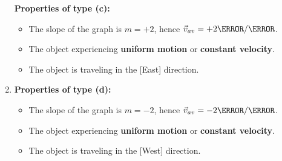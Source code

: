 \documentclass[12pt]{article}
\theoremstyle{break}
\begin{document}
\begin{enumerate}[label = (\alph*)]
		
		\textbf{\large{Properties of type (c):}}
		\begin{itemize}
			\item The slope of the graph is $m = +2$, hence $\vec v_{av} = +2\m / \s$.
			\item The object experiencing \textbf{uniform motion} or \textbf{constant velocity}.
			\item The object is traveling in the [East] direction.
		\end{itemize}

	\item 
		
		\textbf{\large{Properties of type (d):}}
		\begin{itemize}
			\item The slope of the graph is $m = -2$, hence $\vec v_{av} = -2\m / \s$.
			\item The object experiencing \textbf{uniform motion} or \textbf{constant velocity}.
			\item The object is traveling in the [West] direction.
		\end{itemize}

\end{enumerate}
\end{document}
